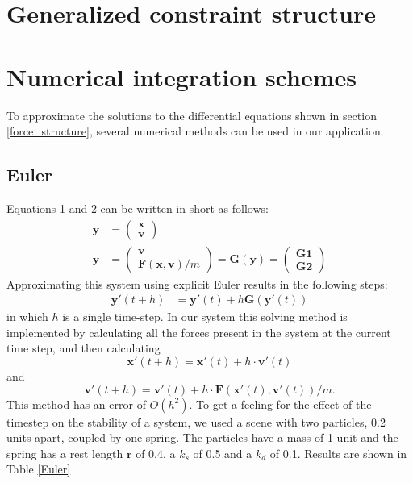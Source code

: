 \documentclass[a4paper,twoside,11pt,twocolumn]{article}
\begin{document}
\section{Generalized constraint structure}

\section{Numerical integration schemes}
\label{Numerical_schemes}
To approximate the solutions to the differential equations shown in section \ref{force_structure}, several numerical methods can be used in our application.
\subsection{Euler}
Equations 1 and 2 can be written in short as follows:
\begin{align}
	\mathbf{y} &= \begin{pmatrix}\mathbf{x}\\\mathbf{v}\end{pmatrix}\\
	\dot{\mathbf{y}} &= \begin{pmatrix}\mathbf{v}\\\mathbf{F}(\mathbf{x}, \mathbf{v})/m\end{pmatrix} = \mathbf{G}(\mathbf{y}) = \begin{pmatrix}\mathbf{G1}\\\mathbf{G2}\end{pmatrix}
\end{align}
Approximating this system using explicit Euler results in the following steps:
\begin{align}
	\mathbf{y}'(t+h) &= \mathbf{y}'(t) + h\mathbf{G}(\mathbf{y}'(t))
\end{align}
in which $h$ is a single time-step. In our system this solving method is implemented by calculating all the forces present in the system at the current time step, and then calculating \[\mathbf{x}'(t+h) = \mathbf{x}'(t) + h\cdot \mathbf{v}'(t)\] and \[\mathbf{v}'(t+h) = \mathbf{v}'(t) + h\cdot \mathbf{F}(\mathbf{x}'(t), \mathbf{v}'(t))/m.\] This method has an error of $O(h^2)$. 
To get a feeling for the effect of the timestep on the stability of a system, we used a scene with two particles, 0.2 units apart, coupled by one spring. The particles have a mass of 1 unit and the spring has a rest length $\mathbf{r}$ of 0.4, a $k_s$ of 0.5 and a $k_d$ of 0.1. Results are shown in Table \ref{Euler}
\end{document}
